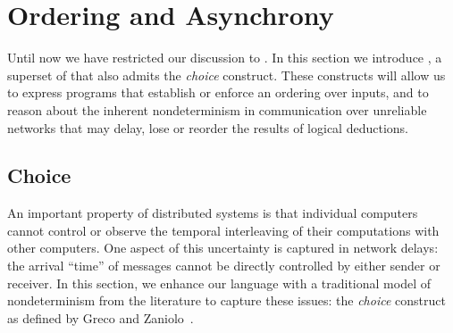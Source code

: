 \section{Ordering and Asynchrony}
\label{sec:async}

%    

Until now we have restricted our discussion to \slang.  In this section we
introduce \lang, a superset of \slang that also admits the \emph{choice} construct.  
These constructs will allow us to
express programs that establish or enforce an ordering over inputs, and to
reason about the inherent nondeterminism in communication over unreliable
networks that may delay, lose or reorder the results of logical deductions. 


\subsection{Choice}



An important property of distributed systems is that individual computers cannot control or observe the temporal interleaving of their computations with other computers.  One aspect of this uncertainty is captured in network delays: the arrival ``time'' of messages cannot be directly controlled by either sender or receiver.  In this section, we enhance our language with a traditional model of nondeterminism from the literature to capture these issues: the \emph{choice} construct as defined by Greco and Zaniolo~\cite{greedychoice}.

